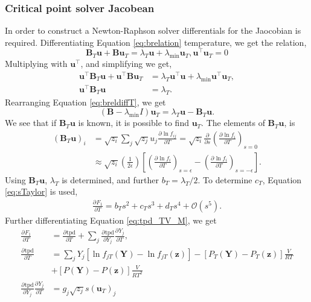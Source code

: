 \documentclass[english]{../thermomemo/thermomemo}
\newcommand*{\pd}[3][]{\frac{\partial^{#1}#2}{\partial{#3}^{#1}}}%
\newcommand{\wrpt}{\text{with respect to~}}
\newcommand{\tpd}{\ensuremath{\text{tpd}}\xspace}
\begin{document}
\subsubsection{Critical point solver Jacobean}
In order to construct a Newton-Raphson solver differentials for the Jaocobian is
required.  Differentiating Equation \ref{eq:brelation} \wrpt temperature, we get
the relation,
\begin{equation}
\mathbf{B}_T \mathbf{u} + \mathbf{B} \mathbf{u}_T = \lambda_{T} \mathbf{u} + \lambda_{\text{min}} \mathbf{u}_T, \mathbf{u}^\intercal\mathbf{u}_T = 0
\label{eq:breldiffT}
\end{equation}
Multiplying with $\mathbf{u}^\intercal$, and simplifying we get,
\begin{align}
\mathbf{u}^\intercal \mathbf{B}_T \mathbf{u} + \mathbf{u}^\intercal\mathbf{B} \mathbf{u}_T &= \lambda_{T} \mathbf{u}^\intercal\mathbf{u} + \lambda_{\text{min}} \mathbf{u}^\intercal\mathbf{u}_T,\\
\mathbf{u}^\intercal \mathbf{B}_T \mathbf{u}  &= \lambda_{T}.
\label{eq:breldiffTuT}
\end{align}
Rearranging Equation \ref{eq:breldiffT}, we get
\begin{equation}
\left(\mathbf{B} - \lambda_{\text{min}}I\right) \mathbf{u}_T = \lambda_{T} \mathbf{u}  - \mathbf{B}_T \mathbf{u}.
\label{eq:breldiffTR}
\end{equation}
We see that if $\mathbf{B}_T \mathbf{u}$ is known, it is possible to
find $\mathbf{u}_T$. The elements of $\mathbf{B}_T \mathbf{u}$, is
\begin{align}
\label{eq:Btu}
  \left(\mathbf{B}_T \mathbf{u}\right)_i &= \sqrt{z_i}\underset{j}{\sum}\sqrt{z_j}u_j \pd{\ln f_{ij}}{T} = \sqrt{z_i} \pd{}{s}\left(\pd{\ln f_{i}}{T}\right)_{s=0} \\ 
                                         &\approx \sqrt{z_i} \left(\frac{1}{2\epsilon}\right)\left[\left(\pd{\ln f_{i}}{T}\right)_{s=\epsilon} - \left(\pd{\ln f_{i}}{T}\right)_{s=-\epsilon} \right].
\end{align}
Using $\mathbf{B}_T \mathbf{u}$, $\lambda_T$ is determined, and further $b_T = \lambda_T/2$. To determine $c_T$, Equation \ref{eq:sTaylor} is used,
\begin{align}
\pd{F_1}{T} = b_Ts^2 + c_Ts^3 + d_Ts^4 + \mathcal{O}(s^5).
\label{eq:dF1dT_Taylor}
\end{align}
Further differentiating Equation \ref{eq:tpd_TV_M}, we get
\begin{align}
\label{eq:dF1dT}
\pd{F_1}{T} &= \pd{\tpd}{T} +
  \underset{j}{\sum}\pd{\tpd}{Y_j}\pd{Y_j}{T},\\
\pd{\tpd}{T} &= \underset{j}{\sum}Y_j\left[\ln f_{jT} \left(\mathbf{Y}\right) -
     \ln f_{jT}\left(\mathbf{z}\right)\right] -
   \left[P_T\left(\mathbf{Y}\right) -
               P_T\left(\mathbf{z}\right)\right]\frac{V}{RT} \\ 
            &+\left[P\left(\mathbf{Y}\right) - P\left(\mathbf{z}\right)\right]\frac{V}{RT^2}\\
\pd{\tpd}{Y_j}\pd{Y_j}{T} &=g_j\sqrt{z_j}s(\mathbf{u}_T)_j
\end{align}
\end{document}
